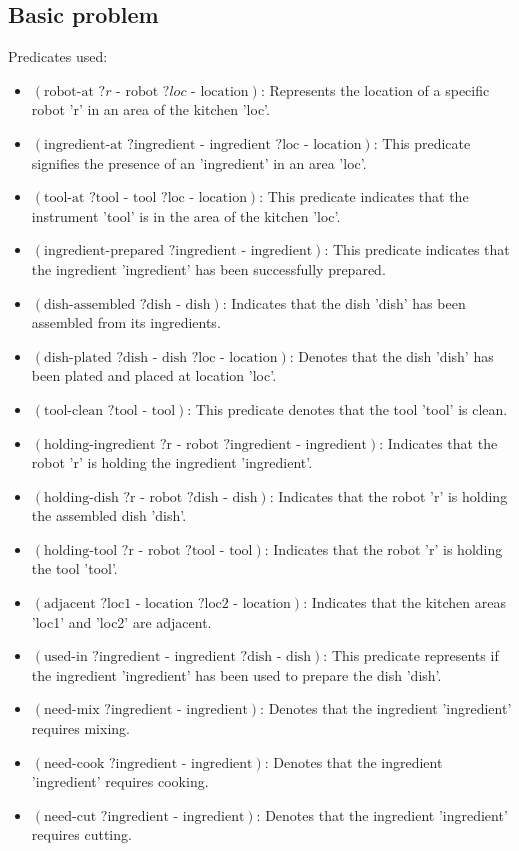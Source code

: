 \subsection{Basic problem}
Predicates used:
\begin{itemize}
  \item $ (\text{robot-at } ?r \text{ - robot } ?loc \text{ - location}) $: Represents the location of a specific robot 'r' in an area of the kitchen 'loc'.
  \item $ (\text{ingredient-at } ?\text{ingredient - ingredient } ?\text{loc - location}) $: This predicate signifies the presence of an 'ingredient' in an area 'loc'.
  \item $ (\text{tool-at } ?\text{tool - tool } ?\text{loc - location}) $: This predicate indicates that the instrument 'tool' is in the area of the kitchen 'loc'.
  \item $ (\text{ingredient-prepared } ?\text{ingredient - ingredient}) $: This predicate indicates that the ingredient 'ingredient' has been successfully prepared.
  \item $ (\text{dish-assembled } ?\text{dish - dish}) $: Indicates that the dish 'dish' has been assembled from its ingredients.
  \item $ (\text{dish-plated } ?\text{dish - dish } ?\text{loc - location}) $: Denotes that the dish 'dish' has been plated and placed at location 'loc'.
  \item $ (\text{tool-clean } ?\text{tool - tool}) $: This predicate denotes that the tool 'tool' is clean.
  \item $ (\text{holding-ingredient } ?\text{r - robot } ?\text{ingredient - ingredient}) $: Indicates that the robot 'r' is holding the ingredient 'ingredient'.
  \item $ (\text{holding-dish } ?\text{r - robot } ?\text{dish - dish}) $: Indicates that the robot 'r' is holding the assembled dish 'dish'.
  \item $ (\text{holding-tool } ?\text{r - robot } ?\text{tool - tool}) $: Indicates that the robot 'r' is holding the tool 'tool'.
  \item $ (\text{adjacent } ?\text{loc1 - location } ?\text{loc2 - location}) $: Indicates that the kitchen areas 'loc1' and 'loc2' are adjacent.
  \item $ (\text{used-in } ?\text{ingredient - ingredient } ?\text{dish - dish}) $: This predicate represents if the ingredient 'ingredient' has been used to prepare the dish 'dish'.
  \item $ (\text{need-mix } ?\text{ingredient - ingredient}) $: Denotes that the ingredient 'ingredient' requires mixing.
  \item $ (\text{need-cook } ?\text{ingredient - ingredient}) $: Denotes that the ingredient 'ingredient' requires cooking.
  \item $ (\text{need-cut } ?\text{ingredient - ingredient}) $: Denotes that the ingredient 'ingredient' requires cutting.
\end{itemize}
